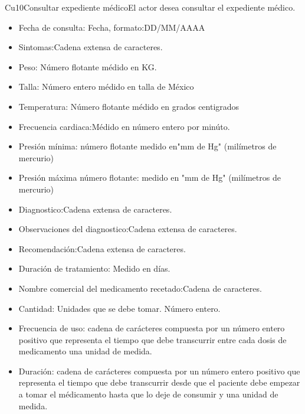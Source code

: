\begin{UseCase}{Cu10}{Consultar expediente médico}{El actor desea consultar el expediente médico.}
{\begin{itemize}
        \begin{itemize}
            \item Fecha de consulta: Fecha, formato:DD/MM/AAAA
            \item Sintomas:Cadena extensa de caracteres.
            \item Peso: Número flotante médido en KG.
            \item Talla: Número entero médido en talla de México
            \item Temperatura: Número flotante médido en grados centigrados
            \item Frecuencia cardiaca:Médido en número entero por minúto.
            \item Presión mínima: número flotante medido en"mm de Hg" (milímetros de mercurio)
            \item Presión máxima número flotante: medido en "mm de Hg" (milímetros de mercurio) 
            \item Diagnostico:Cadena extensa de caracteres.
            \item Observaciones del diagnostico:Cadena extensa de caracteres.
            \item Recomendación:Cadena extensa de caracteres.
            \item Duración de tratamiento: Medido en días.
            \item Nombre comercial del medicamento recetado:Cadena de caracteres.
            \item Cantidad: Unidades que se debe tomar. Número entero.
            \item Frecuencia de uso: cadena de carácteres compuesta por un número entero positivo que representa el tiempo que debe transcurrir entre cada dosis de medicamento una unidad de medida.
            \item Duración: cadena de carácteres compuesta por un número entero positivo que representa el tiempo que debe transcurrir desde que el paciente debe empezar a tomar el médicamento hasta que lo deje de consumir y una unidad de medida.
            

\end{itemize}
\end{itemize}}
\end{UseCase}
